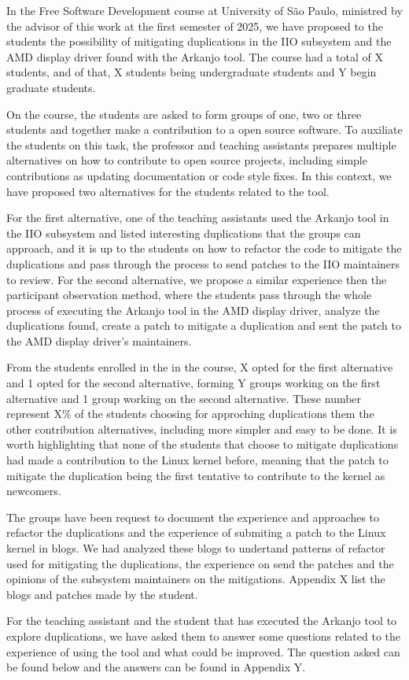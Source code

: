 
In the Free Software Development course at University of São Paulo, ministred by the advisor 
of this work at the first semester of 2025, we have proposed to the students the possibility
of mitigating duplications in the IIO subsystem and the AMD display driver found with the Arkanjo tool.
The course had a total of X students, and of that, X students being undergraduate students
and Y begin graduate students.

On the course, the students are asked to form groups of one, two or three students and together 
make a contribution to a open source software. To auxiliate the students on this task, the 
professor and teaching assistants prepares multiple alternatives on how to contribute to open source projects, 
including simple contributions as updating documentation or code style fixes. In this context, 
we have proposed two alternatives for the students related to the tool.

For the first alternative, one of the teaching assistants used the Arkanjo tool in the IIO subsystem and
listed interesting duplications that the groups can approach, and it is up to the students on how
to refactor the code to mitigate the duplications and pass through the process to send patches to the IIO 
maintainers to review. For the second alternative, we propose a similar experience then the 
participant observation method, where the students pass through the whole process of executing the Arkanjo tool
in the AMD display driver, analyze the duplications found, create a patch to mitigate a duplication and sent
the patch to the AMD display driver's maintainers.

From the students enrolled in the in the course, X opted for the first alternative and 1 opted for the second
alternative, forming Y groups working on the first alternative and 1 group working on the second alternative. 
These number represent X\% of the students choosing for approching duplications them the other contribution 
alternatives, including more simpler and easy to be done.  It is worth highlighting that none of the students
that choose to mitigate duplications had made a contribution to the Linux kernel before,
meaning that the patch to mitigate the duplication being the first tentative to contribute to the kernel as
newcomers.

The groups have been request to document the experience and approaches to refactor the duplications and the
experience of submiting a patch to the Linux kernel in blogs. We had analyzed these blogs to undertand 
patterns of refactor used for mitigating the duplications, the experience on send the patches and the 
opinions of the subsystem maintainers on the mitigations. Appendix X list the blogs and patches made by the 
student.

For the teaching assistant and the student that has executed the Arkanjo tool to explore duplications, 
we have asked them to answer some questions related to the experience of using the tool and what could be
improved. The question asked can be found below and the answers can be found in Appendix Y.


